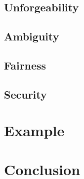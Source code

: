 \documentclass{beamer}
\begin{document}
\subsection{Unforgeability}
% 

\subsection{Ambiguity}
% 

\subsection{Fairness}
% 

\subsection{Security}
% 

\section{Example}


\section{Conclusion}

\end{document}
